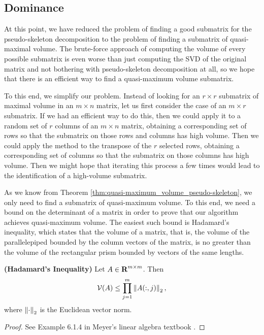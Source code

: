 \documentclass{article}
\begin{document}
	\subsection{Dominance}
	
	At this point, we have reduced the problem of finding a good submatrix for the pseudo-skeleton decomposition to the problem of finding a submatrix of quasi-maximal volume. The brute-force approach of computing the volume of every possible submatrix is even worse than just computing the SVD of the original matrix and not bothering with pseudo-skeleton decomposition at all, so we hope that there is an efficient way to find a quasi-maximum volume submatrix.
	
	To this end, we simplify our problem. Instead of looking for an $r\times r$ submatrix of maximal volume in an $m\times n$ matrix, let us first consider the case of an $m \times r$ submatrix. If we had an efficient way to do this, then we could apply it to a random set of $r$ columns of an $m\times n$ matrix, obtaining a corresponding set of rows so that the submatrix on those rows and columns has high volume. Then we could apply the method to the transpose of the $r$ selected rows, obtaining a corresponding set of columns so that the submatrix on those columns has high volume. Then we might hope that iterating this process a few times would lead to the identification of a high-volume submatrix.
	
	As we know from Theorem \ref{thm:quasi-maximum_volume_pseudo-skeleton}, we only need to find a submatrix of quasi-maximum volume. To this end, we need a bound on the determinant of a matrix in order to prove that our algorithm achieves quasi-maximum volume. The easiest such bound is Hadamard's inequality, which states that the volume of a matrix, that is, the volume of the parallelepiped bounded by the column vectors of the matrix, is no greater than the volume of the rectangular prism bounded by vectors of the same lengths.
	
	\begin{lem} \textnormal{\bf(Hadamard's Inequality)}
		\label{lem:hadamard_inequality}
		Let $A \in \textnormal{\bf R}^{m\times m}$. Then
		\begin{equation}
			\label{eq:hadamard_inequality}
			\mathcal{V}(A) \le \prod_{j=1}^m\left\lVert A(:, j) \right\rVert_2,
		\end{equation}
		where $\left\lVert \cdot \right\rVert_2$ is the Euclidean vector norm.
	\end{lem}
	\begin{proof}
		See Example 6.1.4 in Meyer's linear algebra textbook \cite{meyer_2008}.
	\end{proof}
	
\end{document}
